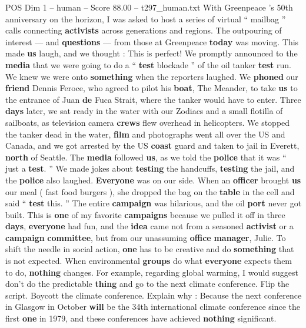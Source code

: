 \begin{textsample}{POS Dim 1 – human – Score 88.00 – t297\_human.txt}  \label{ex:f1_pos_007}
With Greenpeace ’s 50th anniversary on the horizon, I was asked to host a series of virtual “ mailbag ” calls connecting \textbf{activists} across generations and regions.
The outpouring of interest — and \textbf{questions} — from those at Greenpeace \textbf{today} was moving.
This made \textbf{us} laugh, and we thought : This is perfect!
We promptly announced to the \textbf{media} that we were going to do a “ \textbf{test} blockade ” of the oil tanker \textbf{test} run.
We knew we were onto \textbf{something} when the reporters laughed.
We \textbf{phoned} our \textbf{friend} Dennis Feroce, who agreed to pilot his \textbf{boat}, The Meander, to take \textbf{us} to the entrance of Juan \textbf{de} Fuca Strait, where the tanker would have to enter.
Three \textbf{days} later, we sat ready in the water with our Zodiacs and a small flotilla of sailboats, as television camera \textbf{crews} flew overhead in helicopters.
We stopped the tanker dead in the water, \textbf{film} and photographs went all over the US and Canada, and we got arrested by the US \textbf{coast} guard and taken to jail in Everett, \textbf{north} of Seattle.
The \textbf{media} followed \textbf{us}, as we told the \textbf{police} that it was “ just a \textbf{test}. ” We made jokes about \textbf{testing} the handcuffs, \textbf{testing} the jail, and the \textbf{police} also laughed. \textbf{Everyone} was on our side.
When an \textbf{officer} brought \textbf{us} our meal ( fast food burgers ), she dropped the bag on the \textbf{table} in the cell and said “ \textbf{test} this. ” The entire \textbf{campaign} was hilarious, and the oil \textbf{port} never got built.
This is \textbf{one} of my favorite \textbf{campaigns} because we pulled it off in three \textbf{days}, \textbf{everyone} had fun, and the \textbf{idea} came not from a seasoned \textbf{activist} or a \textbf{campaign} \textbf{committee}, but from our unassuming \textbf{office} \textbf{manager}, Julie.
To shift the needle in social action, \textbf{one} has to be creative and do \textbf{something} that is not expected.
When environmental \textbf{groups} do what \textbf{everyone} expects them to do, \textbf{nothing} changes.
For example, regarding global warming, I would suggest don't do the predictable \textbf{thing} and go to the next climate conference.
Flip the script.
Boycott the climate conference.
Explain why : Because the next conference in Glasgow in October \textbf{will} be the 34th international climate conference since the first \textbf{one} in 1979, and these conferences have achieved \textbf{nothing} significant.

\end{textsample}
